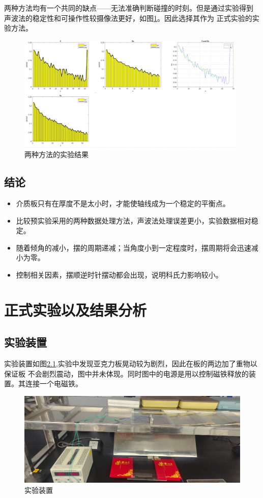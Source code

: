 \documentclass[AutoFakeBold]{LZUThesis}
\begin{document}
两种方法均有一个共同的缺点——无法准确判断碰撞的时刻。但是通过实验得到
声波法的稳定性和可操作性较摄像法更好，如图\ref{data_ways}。因此选择其作为
正式实验的实验方法。

\begin{figure}[H]
    \centering
    \includegraphics[width=11cm]{figures/data_ways.png}
    \caption{两种方法的实验结果}
    \label{data_ways}
\end{figure}

\section{结论}

\begin{itemize}
    \item 介质板只有在厚度不是太小时，才能使轴线成为一个稳定的平衡点。

    \item 比较预实验采用的两种数据处理方法，声波法处理误差更小，实验数据相对稳定。 

    \item 随着倾角的减小，摆的周期递减；当角度小到一定程度时，摆周期将会迅速减小为零。

    \item 控制相关因素，摆顺逆时针摆动都会出现，说明科氏力影响较小。 
\end{itemize}



\chapter{正式实验以及结果分析}
\section{实验装置}
实验装置如图\ref{equ},实验中发现亚克力板晃动较为剧烈，因此在板的两边加了重物以保证板
不会剧烈震动，图中并未体现。同时图中的电源是用以控制磁铁释放的装置。其连接一个电磁铁。
\begin{figure}[H]
    \centering
    \includegraphics[width=12cm]{figures/eq.png}
    \caption{实验装置}
    \label{equ}
\end{figure}
\end{document}
